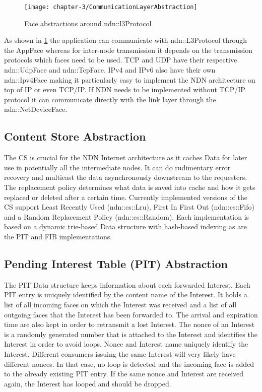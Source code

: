 \vspace{5mm} %

\begin{figure}[H]
  \centering
  \texttt{[image: chapter-3/CommunicationLayerAbstraction]}
  \caption{Face abstractions around ndn::l3Protocol \cite{afanasyev12}}
  \label{fig:CommunicationLayerAbstraction}
\end{figure}

\vspace{5mm} %

As shown in \ref{fig:CommunicationLayerAbstraction} the application can communicate with ndn::L3Protocol through the AppFace whereas for inter-node transmission it depends on the transmission protocols which faces need to be used. TCP and UDP have their respective ndn::UdpFace and ndn::TcpFace. IPv4 and IPv6 also have their own ndn::Ipv4Face making it particularly easy to implement the NDN architecture on top of IP or even TCP/IP. If NDN needs to be implemented without TCP/IP protocol it can communicate directly with the link layer through the ndn::NetDeviceFace.

\subsection{Content Store Abstraction}

The CS is crucial for the NDN Internet architecture as it caches Data for later use in potentially all the intermediate nodes. It can do rudimentary error recovery and multicast the data asynchronously downstream to the requesters. The replacement policy determines what data is saved into cache and how it gets replaced or deleted after a certain time. Currently implemented versions of the CS support Least Recently Used (ndn::cs::Lru), First In First Out (ndn::cs::Fifo) and a Random Replacement Policy (ndn::cs::Random). Each implementation is based on a dynamic trie-based Data structure with hash-based indexing as are the PIT and FIB implementations.

\subsection{Pending Interest Table (PIT) Abstraction}

The PIT Data structure keeps information about each forwarded Interest. Each PIT entry is uniquely identified by the content name of the Interest. It holds a list of all incoming faces on which the Interest was received and a list of all outgoing faces that the Interest has been forwarded to. The arrival and expiration time are also kept in order to retransmit a lost Interest. The nonce of an Interest is a randomly generated number that is attached to the Interest and identifies the Interest in order to avoid loops. Nonce and Interest name uniquely identify the Interest. Different consumers issuing the same Interest will very likely have different nonces. In that case, no loop is detected and the incoming face is added to the already existing PIT entry. If the same nonce and Interest are received again, the Interest has looped and should be dropped.

